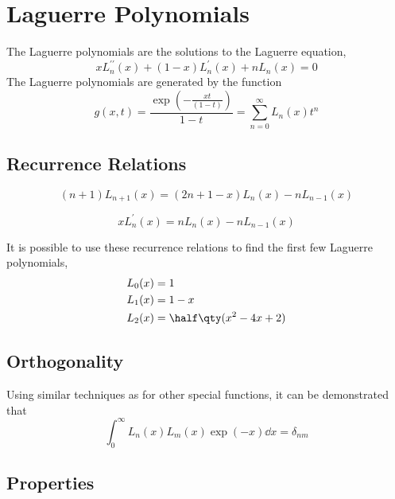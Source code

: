\section{Laguerre Polynomials}
\label{sec:laguerre}
The Laguerre polynomials are the solutions to the Laguerre equation,
\begin{equation}
  \label{eq:laguerrede}
  x L_n^{\prime \prime} (x) + (1-x) L_n^{\prime}(x) + n L_n(x) = 0
\end{equation}
The Laguerre polynomials are generated by the function
\begin{equation}
  \label{eq:3}
  g(x,t) = \frac{\exp( - \frac{xt}{(1-t)})}{1-t} = \sum_{n=0}^{\infty} L_n(x) t^n
\end{equation}

\subsection{Recurrence Relations }
\label{sec:recurr-relat-lag}

\begin{equation}
  \label{eq:4}
  (n+1) L_{n+1}(x) = (2n +1 -x) L_n(x) - nL_{n-1}(x)
\end{equation}

\begin{equation}
  \label{eq:5}
  xL^{\prime}_n(x) = nL_n(x) - nL_{n-1}(x)
\end{equation}

It is possible to use these recurrence relations to find the first few
Laguerre polynomials,
\begin{align*}
  L_0(x) &= 1 \\
L_1(x) &= 1-x \\
L_2(x) &= \half \qty(x^2 - 4x + 2)
\end{align*}

\subsection{Orthogonality}
\label{sec:orthogonality}

Using similar techniques as for other special functions, it can be demonstrated that
\begin{equation}
  \label{eq:orthoglag}
  \int_0^{\infty} L_n(x) L_m(x) \exp(-x) \dd{x} = \delta_{nm}
\end{equation}

\subsection{Properties}
\label{sec:properties}

